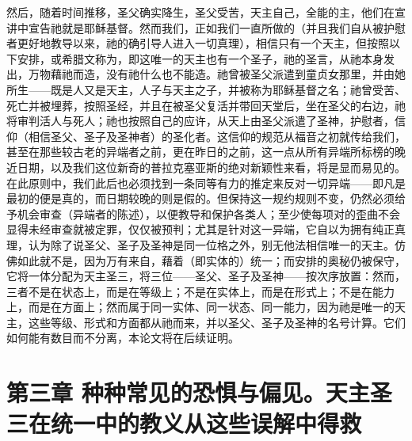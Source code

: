 然后，随着时间推移，圣父确实降生，圣父受苦，天主自己，全能的主，他们在宣讲中宣告祂就是耶稣基督。然而我们，正如我们一直所做的（并且我们自从被护慰者更好地教导以来，祂的确引导人进入一切真理），相信只有一个天主，但按照以下安排，或希腊文称为，即这唯一的天主也有一个圣子，祂的圣言，从祂本身发出，万物藉祂而造，没有祂什么也不能造。祂曾被圣父派遣到童贞女那里，并由她所生——既是人又是天主，人子与天主之子，并被称为耶稣基督之名；祂曾受苦、死亡并被埋葬，按照圣经，并且在被圣父复活并带回天堂后，坐在圣父的右边，祂将审判活人与死人；祂也按照自己的应许，从天上由圣父派遣了圣神，护慰者，信仰（相信圣父、圣子及圣神者）的圣化者。这信仰的规范从福音之初就传给我们，甚至在那些较古老的异端者之前，更在昨日的之前，这一点从所有异端所标榜的晚近日期，以及我们这位新奇的普拉克塞亚斯的绝对新颖性来看，将是显而易见的。在此原则中，我们此后也必须找到一条同等有力的推定来反对一切异端——即凡是最初的便是真的，而日期较晚的则是假的。但保持这一规约规则不变，仍然必须给予机会审查（异端者的陈述），以便教导和保护各类人；至少使每项对的歪曲不会显得未经审查就被定罪，仅仅被预判；尤其是针对这一异端，它自以为拥有纯正真理，认为除了说圣父、圣子及圣神是同一位格之外，别无他法相信唯一的天主。仿佛如此就不是，因为万有来自，藉着（即实体的）统一；而安排的奥秘仍被保守，它将一体分配为天主圣三，将三位——圣父、圣子及圣神——按次序放置：然而，三者不是在状态上，而是在等级上；不是在实体上，而是在形式上；不是在能力上，而是在方面上；然而属于同一实体、同一状态、同一能力，因为祂是唯一的天主，这些等级、形式和方面都从祂而来，并以圣父、圣子及圣神的名号计算。它们如何能有数目而不分离，本论文将在后续证明。\par


\section{第三章 种种常见的恐惧与偏见。天主圣三在统一中的教义从这些误解中得救}

